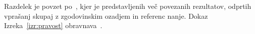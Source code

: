 \documentclass[12pt,a4paper,twoside]{article}
\newcommand{\literatura}{literatura}  %
\theoremstyle{definition} %
\theoremstyle{plain} %
\numberwithin{equation}{section}  %
\begin{document}
Razdelek je povzet po~\cite[Section~3.9,~3.10]{alarcon2021minimal}, kjer je predstavljenih več povezanih rezultatov, odprtih vprašanj skupaj z zgodovinskim ozadjem in referenc nanje. Dokaz Izreka~\ref{izr:pravost} obravnava~\cite[Section~3.11]{alarcon2021minimal}.


\cleardoublepage                           %

\cleardoublepage                           %
\printindex
\end{document}
